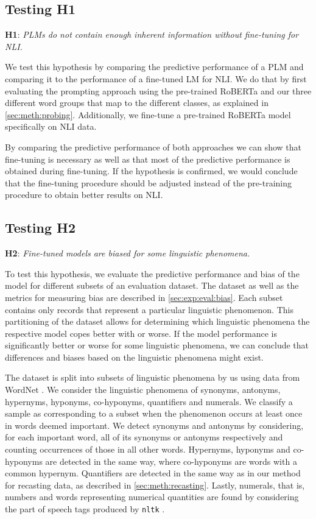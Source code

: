 \subsection{Testing H1}
\textbf{H1}: \textit{\acp{PLM} do not contain enough inherent information without fine-tuning for \ac{NLI}.}

We test this hypothesis by comparing the predictive performance of a \ac{PLM} and comparing it to the performance of a fine-tuned \ac{LM} for \ac{NLI}. We do that by first evaluating the prompting approach using the pre-trained \ac{RoBERTa} and our three different word groups that map to the different classes, as explained in \autoref{sec:meth:probing}. Additionally, we fine-tune a pre-trained \ac{RoBERTa} model specifically on \ac{NLI} data. 

By comparing the predictive performance of both approaches we can show that fine-tuning is necessary as well as that most of the predictive performance is obtained during fine-tuning. If the hypothesis is confirmed, we would conclude that the fine-tuning procedure should be adjusted instead of the pre-training procedure to obtain better results on \ac{NLI}.

\subsection{Testing H2}
\textbf{H2}: \textit{Fine-tuned models are biased for some linguistic phenomena.}

To test this hypothesis, we evaluate the predictive performance and bias of the model for different subsets of an evaluation dataset. The dataset as well as the metrics for measuring bias are described in \autoref{sec:exp:eval:bias}. Each subset contains only records that represent a particular linguistic phenomenon. This partitioning of the dataset allows for determining which linguistic phenomena the respective model copes better with or worse. If the model performance is significantly better or worse for some linguistic phenomena, we can conclude that differences and biases based on the linguistic phenomena might exist.

The dataset is split into subsets of linguistic phenomena by us using data from WordNet \cite{miller-1994-wordnet}. We consider the linguistic phenomena of synonyms, antonyms, hypernyms, hyponyms, co-hyponyms, quantifiers and numerals. We classify a sample as corresponding to a subset when the phenomenon occurs at least once in words deemed important. We detect synonyms and antonyms by considering, for each important word, all of its synonyms or antonyms respectively and counting occurrences of those in all other words. Hypernyms, hyponyms and co-hyponyms are detected in the same way, where co-hyponyms are words with a common hypernym. Quantifiers are detected in the same way as in our method for recasting data, as described in \autoref{sec:meth:recasting}. Lastly, numerals, that is, numbers and words representing numerical quantities are found by considering the part of speech tags produced by \texttt{nltk} \cite{nltk}.

